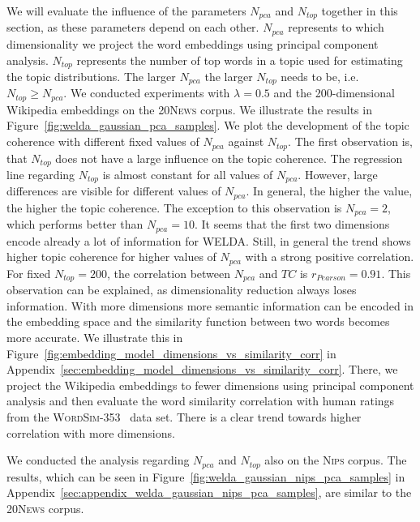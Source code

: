 \documentclass[
        a4paper,
        titlepage,
        twoside,
        parskip,
        numbers=noenddot
        ]{scrbook}
\theoremstyle{break}
\begin{document}
We will evaluate the influence of the parameters $N_{pca}$ and $N_{top}$ together in this section, as these parameters depend on each other.
$N_{pca}$ represents to which dimensionality we project the word embeddings using principal component analysis.
$N_{top}$ represents the number of top words in a topic used for estimating the topic distributions.
The larger $N_{pca}$ the larger $N_{top}$ needs to be, i.e. $N_{top} \geq N_{pca}$.
We conducted experiments with $\lambda = 0.5$ and the 200-dimensional Wikipedia embeddings on the \textsc{20News} corpus.
We illustrate the results in Figure~\ref{fig:welda_gaussian_pca_samples}.
We plot the development of the topic coherence with different fixed values of $N_{pca}$ against $N_{top}$.
The first observation is, that $N_{top}$ does not have a large influence on the topic coherence.
The regression line regarding $N_{top}$ is almost constant for all values of $N_{pca}$.
However, large differences are visible for different values of $N_{pca}$.
In general, the higher the value, the higher the topic coherence.
The exception to this observation is $N_{pca} = 2$, which performs better than $N_{pca} = 10$.
It seems that the first two dimensions encode already a lot of information for WELDA.
Still, in general the trend shows higher topic coherence for higher values of $N_{pca}$ with a strong positive correlation.
For fixed $N_{top} = 200$, the correlation between $N_{pca}$ and $TC$ is $r_{Pearson} = 0.91$.
This observation can be explained, as dimensionality reduction always loses information.
With more dimensions more semantic information can be encoded in the embedding space and the similarity function between two words becomes more accurate.
We illustrate this in Figure~\ref{fig:embedding_model_dimensions_vs_similarity_corr} in Appendix~\ref{sec:embedding_model_dimensions_vs_similarity_corr}.
There, we project the Wikipedia embeddings to fewer dimensions using principal component analysis and then evaluate the word similarity correlation with human ratings from the \textsc{WordSim-353}~\cite{Agirre2009} data set.
There is a clear trend towards higher correlation with more dimensions.

We conducted the analysis regarding $N_{pca}$ and $N_{top}$ also on the \textsc{Nips} corpus.
The results, which can be seen in Figure~\ref{fig:welda_gaussian_nips_pca_samples} in Appendix~\ref{sec:appendix_welda_gaussian_nips_pca_samples}, are similar to the \textsc{20News} corpus.
\end{document}
